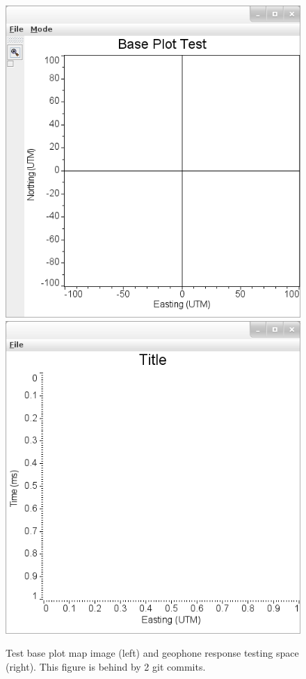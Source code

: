 \documentclass[a4paper,11pt]{texMemo}
\begin{document}
\begin{figure}[H]
\centering
\includegraphics[scale=.3]{plot1.png} \includegraphics[scale=.3]{plot2.png}
\caption{Test base plot map image (left) and geophone response testing space (right). This figure is behind by 2 git commits.} 
\end{figure}
\end{document}
